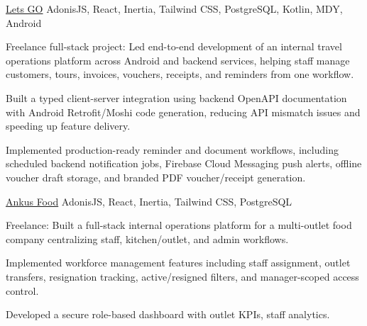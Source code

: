 {}
{\href{https://www.exploreletsgo.com}{Lets GO}}
{AdonisJS, React, Inertia, Tailwind CSS, PostgreSQL, Kotlin, MDY, Android}
{\jbegin
    \item{Freelance full‑stack project: Led end-to-end development of an internal travel operations platform across Android and backend services, helping staff manage customers, tours, invoices, vouchers, receipts, and reminders from one workflow.}
    \item {Built a typed client-server integration using backend OpenAPI documentation with Android Retrofit/Moshi code generation, reducing API mismatch issues and speeding up feature delivery.}
    \item {Implemented production-ready reminder and document workflows, including scheduled backend notification jobs, Firebase Cloud Messaging push alerts, offline voucher draft storage, and branded PDF voucher/receipt generation.}
\jend}

{}
{\href{https://ankusfood.com}{Ankus Food}}
{AdonisJS, React, Inertia, Tailwind CSS, PostgreSQL}
{\jbegin
    \item{Freelance: Built a full-stack internal operations platform for a multi-outlet food company centralizing staff, kitchen/outlet, and admin workflows.}
    \item {Implemented workforce management features including staff assignment, outlet transfers, resignation tracking, active/resigned filters, and manager-scoped access control.}
    \item {Developed a secure role-based dashboard with outlet KPIs, staff analytics.}
\jend}










